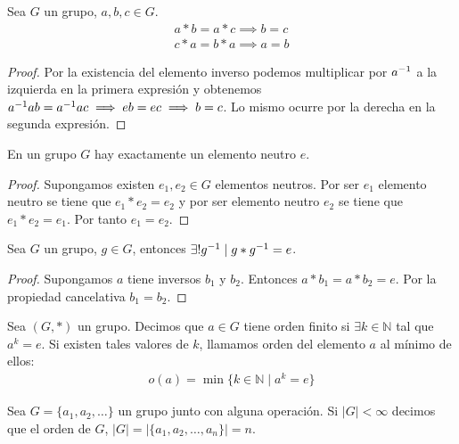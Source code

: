\begin{thm}
	Sea $G$ un grupo, $a, b, c \in G$.
	\begin{align}
		a \ast b = a \ast c \implies b = c \\
		c \ast a = b \ast a \implies a = b
	\end{align}
\end{thm}

\begin{proof}
	Por la existencia del elemento inverso podemos multiplicar por $a^{-1}$ a la izquierda en la primera expresión y obtenemos $a^{-1} a b = a^{-1} a c \implies e b = e c \implies b = c$. Lo mismo ocurre por la derecha en la segunda expresión.
\end{proof}

\begin{pro}
	En un grupo $G$ hay exactamente un elemento neutro $e$.
\end{pro}

\begin{proof}
	Supongamos existen $e_1, e_2 \in G$ elementos neutros. Por ser $e_1$ elemento neutro se tiene que $e_1 \ast e_2 = e_2$ y por ser elemento neutro $e_2$ se tiene que $e_1 \ast e_2 = e_1$. Por tanto $e_1 = e_2$.
\end{proof}

\begin{pro}
	Sea $G$ un grupo, $g \in G$, entonces $\exists! g^{-1} \mid g \ast g^{-1} = e$. 
\end{pro}

\begin{proof}
	Supongamos $a$ tiene inversos $b_1$ y $b_2$. Entonces $a \ast b_1 = a \ast b_2 = e$. Por la propiedad cancelativa $b_1 = b_2$.
\end{proof}

\begin{dfn}
	Sea $(G, \ast)$ un grupo. Decimos que $a \in G$ tiene orden finito si $\exists k \in \mathbb{N}$ tal que $a^k = e$.
	Si existen tales valores de $k$, llamamos orden del elemento $a$ al mínimo de ellos:
	\begin{align}
		o(a) = \min \{k \in \mathbb{N} \mid a^k = e \}
	\end{align}
\end{dfn}

\begin{dfn}
	Sea $G = \{a_1, a_2, \dots \}$ un grupo junto con alguna operación. Si $|G| < \infty$ decimos que el orden de $G$, $|G| = |\{a_1, a_2, \dots, a_n\}| = n$.
\end{dfn}

